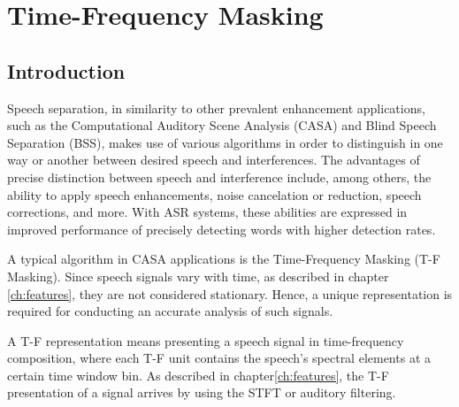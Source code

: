 \chapter{Time-Frequency Masking}\label{ch:tf_mask_ch}
\section{Introduction}
Speech separation, in similarity to other 
prevalent enhancement applications, such as the 
Computational Auditory Scene Analysis (CASA)\cite{BROWN1994297}
and Blind Speech Separation (BSS)\cite{6709849},
makes use of various
algorithms in order to distinguish in one way or another
between desired speech and interferences.
The advantages of precise distinction 
between speech and interference include, among others,
the ability to apply speech enhancements, 
noise cancelation or reduction, speech corrections, and more.
With ASR systems, these abilities are expressed in 
improved performance of precisely detecting words
with higher detection rates.

A typical algorithm in CASA applications is the 
Time-Frequency Masking (T-F Masking). 
Since speech signals vary with time, 
as described in chapter \;\ref{ch:features}, 
they are not considered stationary. 
Hence, a unique representation is required 
for conducting an accurate analysis of such signals. 

A T-F representation means presenting a speech 
signal in time-frequency composition, 
where each T-F unit contains the 
speech's spectral elements at a certain time window bin. 
As described in chapter\;\ref{ch:features}, 
the T-F presentation of a signal 
arrives by using the STFT or auditory filtering\cite{Xia2017UsingOR}.

